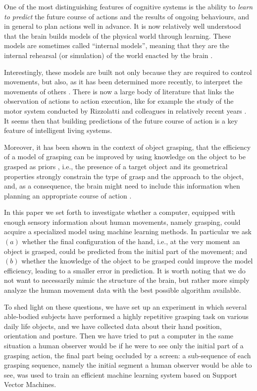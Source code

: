 One of the most distinguishing features of cognitive systems is the
ability to \emph{learn to predict} the future course of actions and
the results of ongoing behaviours, and in general to plan actions well
in advance. It is now relatively well understood that the brain builds
models of the physical world through learning. These models are
sometimes called ``internal models'', meaning that they are the
internal rehearsal (or simulation) of the world enacted by the brain 
\cite{kawato-99}.

Interestingly, these models are built not only because they are
required to control movements, but also, as it has been determined
more recently, to interpret the movements of others \cite{wolpert-03, 
mussaivaldi-00, lackner-98}. There is now a large body of
literature that links the observation of actions to action execution,
like for example the study of the motor system conducted by Rizzolatti
and colleagues in relatively recent years
\cite{rizzolatti-04,gallese-96,rizzolatti-01}. It seems then that
building predictions of the future course of action is a key feature 
of intelligent living systems.

Moreover, it has been shown in the context of object grasping, that
the efficiency of a model of grasping can be improved by using knowledge 
on the object to be grasped as priors \cite{lopes-05, metta-06}, i.e., the presence of a target 
object and its geometrical properties strongly constrain the type of 
grasp and the approach to the object, and, as a consequence, the brain 
might need to include this information when planning an appropriate course 
of action \cite{sakata-95}.

In this paper we set forth to investigate whether a computer, equipped
with enough sensory information about human movements, namely
grasping, could acquire a specialized model using machine
learning methods. In particular we ask $(a)$ whether the final
configuration of the hand, i.e., at the very moment an object is
grasped, could be predicted from the initial part of the movement; and
$(b)$ whether the knowledge of the object to be grasped could improve
the model efficiency, leading to a smaller error in prediction.
It is worth noting that we do not want to necessarily mimic the structure
of the brain, but rather more simply analyze the human movement data 
with the best possible algorithm available.

To shed light on these questions, we have set up an experiment in
which several able-bodied subjects have performed a highly repetitive
grasping task on various daily life objects, and we have collected
data about their hand position, orientation and posture. Then we have
tried to put a computer in the same situation a human observer would
be if he were to see only the initial part of a grasping action, the
final part being occluded by a screen: a sub-sequence of each grasping
sequence, namely the initial segment a human observer would be able to
see, was used to train an efficient machine learning system based on
Support Vector Machines.

